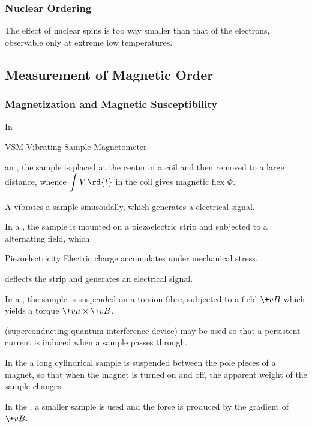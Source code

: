 \documentclass[hidelinks]{article}
\begin{document}

\subsubsection{Nuclear Ordering} %
\label{ssub:nuclear_ordering}

The effect of nuclear spins is too way smaller than that of the electrons, observable only at extreme low temperatures.



\subsection{Measurement of Magnetic Order} %
\label{sub:measurement_of_magnetic_order}

\subsubsection{Magnetization and Magnetic Susceptibility} %
\label{ssub:magnetization_and_magnetic_susceptibility}

In \begin{margindef}[-4\baselineskip]{VSM}
    Vibrating Sample Magnetometer.
\end{margindef} an , the sample is placed at the center of a coil and then removed to a large distance, whence $\displaystyle \int V\,\rd{t}$ in the coil gives magnetic flex $\Phi$.
\par
A  vibrates a sample sinusoidally, which generates a electrical signal.
\par
In a , the sample is mounted on a piezoelectric strip and subjected to a alternating field, which \begin{margindef}[\baselineskip]{Piezoelectricity}
    Electric charge accumulates under mechanical stress.
\end{margindef} deflects the strip and generates an electrical signal.
\par
In a , the sample is suspended on a torsion fibre, subjected to a field $\+vB$ which yields a torque $\+v\mu\times \+vB$.
\par
{} (superconducting quantum interference device) may be used so that a persistent current is induced when a sample passes through.
\par
In the  a long cylindrical sample is suspended between the pole pieces of a magnet, so that when the magnet is turned on and off, the apparent weight of the sample changes.
\par
In the , a smaller sample is used and the force is produced by the gradient of $\+vB$.
\end{document}
